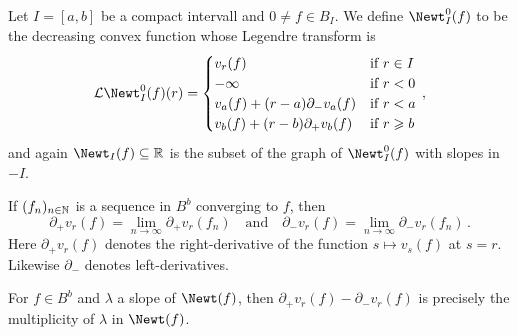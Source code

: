 \documentclass[a4paper, 10pt, oneside, DIV=9, chapterprefix=true, numbers=enddot,bibliography=totoc]{scrbook}
\begin{document}
\begin{defi}
	Let $I=[a,b]$ be a compact intervall and $0\neq f\in B_I$. We define $\Newt_I^0(f)$ to be the decreasing convex function whose Legendre transform is
	\begin{equation*}
		\Ll\Newt_I^0(f)(r)=\begin{cases}
		v_r(f) & \text{if }r\in I\\
		-\infty & \text{if }r<0\\
		v_a(f)+(r-a)\partial_-v_a(f) & \text{if }r<a\\
		v_b(f)+(r-b)\partial_+v_b(f) & \text{if }r\geq b
		\end{cases}\,,
	\end{equation*}
	and again $\Newt_I(f)\subseteq \IR$ is the subset of the graph of $\Newt_I^0(f)$ with slopes in $-I$.
\end{defi}
\begin{rem}
	\begin{numerate}
		\item If $(f_n)_{n\in\mathbb{N}}$ is a sequence in $B^b$ converging to $f$, then
		\begin{equation*}
			\partial_+v_r(f)=\lim_{n\to\infty}\partial_+v_r(f_n)\quad\text{and}\quad\partial_-v_r(f)=\lim_{n\to\infty}\partial_-v_r(f_n)\,.
		\end{equation*}
		Here $\partial_+v_r(f)$ denotes the right-derivative of the function $s\mapsto v_s(f)$ at $s=r$. Likewise $\partial_-$ denotes left-derivatives.
		\item For $f\in B^b$ and $\lambda$ a slope of $\Newt(f)$, then $\partial_+v_r(f)-\partial_-v_r(f)$ is precisely the multiplicity of $\lambda$ in $\Newt(f)$.
	\end{numerate}
\end{rem}
\end{document}
